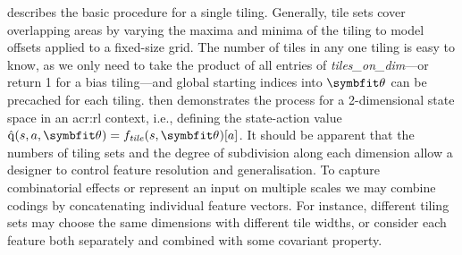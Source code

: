  describes the basic procedure for a single tiling.
Generally, tile sets cover overlapping areas by varying the maxima and minima of the tiling to model offsets applied to a fixed-size grid.
The number of tiles in any one tiling is easy to know, as we only need to take the product of all entries of \emph{tiles\_on\_dim}---or return 1 for a bias tiling---and global starting indices into $\wvec{}$ can be precached for each tiling.
 then demonstrates the process for a 2-dimensional state space in an \gls{acr:rl} context, i.e., defining the state-action value $\acval{s}{a}{\wvec{}} = f_\mathit{tile}(s, \wvec{})[a]$.
It should be apparent that the numbers of tiling sets and the degree of subdivision along each dimension allow a designer to control feature resolution and generalisation.
To capture combinatorial effects or represent an input on multiple scales we may combine codings by concatenating individual feature vectors.
For instance, different tiling sets may choose the same dimensions with different tile widths, or consider each feature both separately and combined with some covariant property.

